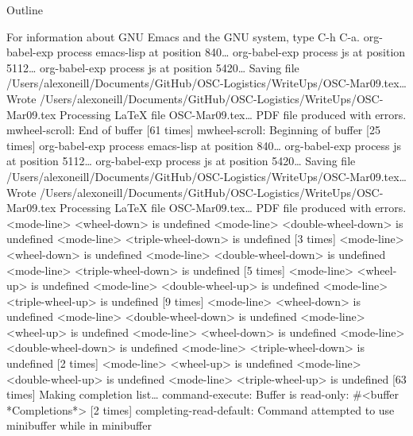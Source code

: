 \documentclass[presentation]{beamer}
\author{Alex O'Neill}
\date{\today}
\title{}
\begin{document}
\begin{frame}{Outline}
\tableofcontents
\end{frame}

For information about GNU Emacs and the GNU system, type C-h C-a.
org-babel-exp process emacs-lisp at position 840\ldots{}
org-babel-exp process js at position 5112\ldots{}
org-babel-exp process js at position 5420\ldots{}
Saving file /Users/alexoneill/Documents/GitHub/OSC-Logistics/WriteUps/OSC-Mar09.tex\ldots{}
Wrote /Users/alexoneill/Documents/GitHub/OSC-Logistics/WriteUps/OSC-Mar09.tex
Processing \LaTeX{} file OSC-Mar09.tex\ldots{}
PDF file produced with errors.
mwheel-scroll: End of buffer [61 times]
mwheel-scroll: Beginning of buffer [25 times]
org-babel-exp process emacs-lisp at position 840\ldots{}
org-babel-exp process js at position 5112\ldots{}
org-babel-exp process js at position 5420\ldots{}
Saving file /Users/alexoneill/Documents/GitHub/OSC-Logistics/WriteUps/OSC-Mar09.tex\ldots{}
Wrote /Users/alexoneill/Documents/GitHub/OSC-Logistics/WriteUps/OSC-Mar09.tex
Processing \LaTeX{} file OSC-Mar09.tex\ldots{}
PDF file produced with errors.
<mode-line> <wheel-down> is undefined
<mode-line> <double-wheel-down> is undefined
<mode-line> <triple-wheel-down> is undefined [3 times]
<mode-line> <wheel-down> is undefined
<mode-line> <double-wheel-down> is undefined
<mode-line> <triple-wheel-down> is undefined [5 times]
<mode-line> <wheel-up> is undefined
<mode-line> <double-wheel-up> is undefined
<mode-line> <triple-wheel-up> is undefined [9 times]
<mode-line> <wheel-down> is undefined
<mode-line> <double-wheel-down> is undefined
<mode-line> <wheel-up> is undefined
<mode-line> <wheel-down> is undefined
<mode-line> <double-wheel-down> is undefined
<mode-line> <triple-wheel-down> is undefined [2 times]
<mode-line> <wheel-up> is undefined
<mode-line> <double-wheel-up> is undefined
<mode-line> <triple-wheel-up> is undefined [63 times]
Making completion list\ldots{}
command-execute: Buffer is read-only: \#<buffer *Completions*> [2 times]
completing-read-default: Command attempted to use minibuffer while in minibuffer
\end{document}
